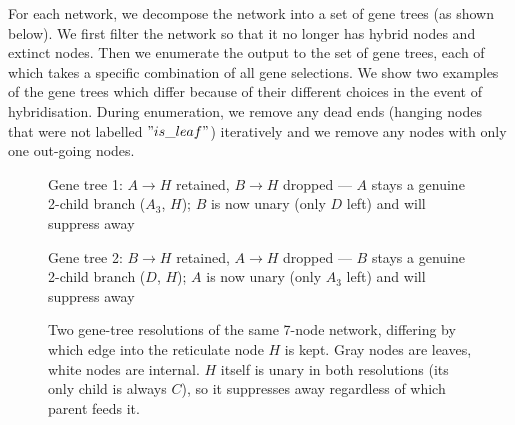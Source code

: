For each network, we decompose the network into a set of gene trees (as shown below). We first filter the network so that it no longer has hybrid nodes and extinct nodes. Then we enumerate the output to the set of gene trees, each of which takes a specific combination of all gene selections. We show two examples of the gene trees which differ because of their different choices in the event of hybridisation. During enumeration, we remove any dead ends (hanging nodes that were not labelled $"is\_leaf"$) iteratively and we remove any nodes with only one out-going nodes.
\begin{figure}[h]
\centering
\begin{minipage}{0.48\textwidth}
\centering
{}

\small Gene tree 1: $A\!\to\!H$ retained, $B\!\to\!H$ dropped --- $A$ stays a genuine 2-child branch ($A_3$, $H$); $B$ is now unary (only $D$ left) and will suppress away
\end{minipage}
\hfill
\begin{minipage}{0.48\textwidth}
\centering
{}

\small Gene tree 2: $B\!\to\!H$ retained, $A\!\to\!H$ dropped --- $B$ stays a genuine 2-child branch ($D$, $H$); $A$ is now unary (only $A_3$ left) and will suppress away
\end{minipage}
\caption{Two gene-tree resolutions of the same 7-node network, differing by which edge into the reticulate node $H$ is kept. Gray nodes are leaves, white nodes are internal. $H$ itself is unary in both resolutions (its only child is always $C$), so it suppresses away regardless of which parent feeds it.}
\end{figure}

